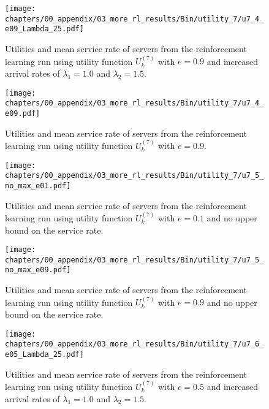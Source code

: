 \begin{figure}[H]
    \texttt{[image: chapters/00\_appendix/03\_more\_rl\_results/Bin/utility\_7/u7\_4\_e09\_Lambda\_25.pdf]}
    \caption{Utilities and mean service rate of servers from the reinforcement
    learning run using utility function \(U_k^{(7)}\) with \(e = 0.9\) and
    increased arrival rates of \(\lambda_1 = 1.0\) and \(\lambda_2 = 1.5\).}
    \label{fig:RL_utility7_4_e09_Lambda_25}
\end{figure}

\begin{figure}[H]
    \texttt{[image: chapters/00\_appendix/03\_more\_rl\_results/Bin/utility\_7/u7\_4\_e09.pdf]}
    \caption{Utilities and mean service rate of servers from the reinforcement
    learning run using utility function \(U_k^{(7)}\) with \(e = 0.9\).}
    \label{fig:RL_utility7_4_e09}
\end{figure}


\begin{figure}[H]
    \texttt{[image: chapters/00\_appendix/03\_more\_rl\_results/Bin/utility\_7/u7\_5\_no\_max\_e01.pdf]}
    \caption{Utilities and mean service rate of servers from the reinforcement
    learning run using utility function \(U_k^{(7)}\) with \(e = 0.1\) and no
    upper bound on the service rate.}
    \label{fig:RL_utility7_5_no_max_e01}
\end{figure}

\begin{figure}[H]
    \texttt{[image: chapters/00\_appendix/03\_more\_rl\_results/Bin/utility\_7/u7\_5\_no\_max\_e09.pdf]}
    \caption{Utilities and mean service rate of servers from the reinforcement
    learning run using utility function \(U_k^{(7)}\) with \(e = 0.9\) and no
    upper bound on the service rate.}
    \label{fig:RL_utility7_5_no_max_e09}
\end{figure}


\begin{figure}[H]
    \texttt{[image: chapters/00\_appendix/03\_more\_rl\_results/Bin/utility\_7/u7\_6\_e05\_Lambda\_25.pdf]}
    \caption{Utilities and mean service rate of servers from the reinforcement
    learning run using utility function \(U_k^{(7)}\) with \(e = 0.5\) and
    increased arrival rates of \(\lambda_1 = 1.0\) and \(\lambda_2 = 1.5\).}
    \label{fig:RL_utility7_6_e05_Lambda_25}
\end{figure}

